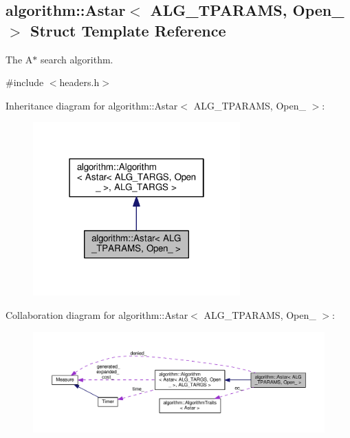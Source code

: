 \hypertarget{structalgorithm_1_1Astar}{}\subsection{algorithm\+:\+:Astar$<$ A\+L\+G\+\_\+\+T\+P\+A\+R\+A\+MS, Open\+\_\+ $>$ Struct Template Reference}
\label{structalgorithm_1_1Astar}


The {\ttfamily A$\ast$} search algorithm.  




{\ttfamily \#include $<$headers.\+h$>$}



Inheritance diagram for algorithm\+:\+:Astar$<$ A\+L\+G\+\_\+\+T\+P\+A\+R\+A\+MS, Open\+\_\+ $>$\+:\nopagebreak
\begin{figure}[H]
\begin{center}
\leavevmode
\includegraphics[width=226pt]{structalgorithm_1_1Astar__inherit__graph}
\end{center}
\end{figure}


Collaboration diagram for algorithm\+:\+:Astar$<$ A\+L\+G\+\_\+\+T\+P\+A\+R\+A\+MS, Open\+\_\+ $>$\+:\nopagebreak
\begin{figure}[H]
\begin{center}
\leavevmode
\includegraphics[width=350pt]{structalgorithm_1_1Astar__coll__graph}
\end{center}
\end{figure}
